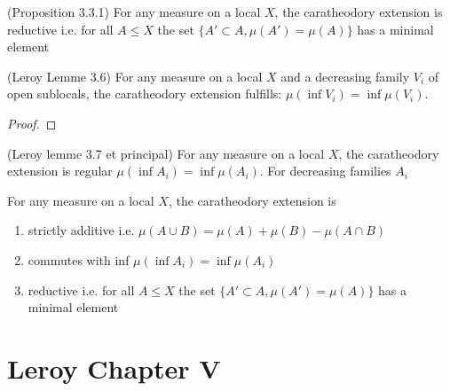 \begin{proposition}[reductive]
    \label{prop:reductive}  (Proposition 3.3.1)
    For any measure on a local $X$, the caratheodory extension is
    reductive i.e. for all $A \le X$ the set $\{A' \subset A, \mu(A') = \mu(A)\}$ has a minimal element
\end{proposition}



\begin{lemma}
(Leroy Lemme 3.6)
    \label{lem:commutes_with_inf_opens}
    \leanok
    For any measure on a local $X$ and a decreasing family $V_i$ of open sublocals, the caratheodory extension fulfills: $\mu (\inf V_i) = \inf \mu(V_i)$.
\end{lemma}
\begin{proof}
    \leanok
\end{proof}

\begin{proposition}
(Leroy lemme 3.7 et principal)
    \label{prop:commutes_with_inf}
    For any measure on a local $X$, the caratheodory extension is
    regular $\mu (\inf A_i) = \inf \mu(A_i)$. For decreasing families $A_i$
\end{proposition}

\begin{theorem}
    \label{thm:main}
    For any measure on a local $X$, the caratheodory extension is
    \begin{enumerate}
        \item strictly additive i.e. $\mu (A \cup B) = \mu(A) + \mu(B) - \mu(A \cap B)$
        \item commutes with inf $\mu (\inf A_i) = \inf \mu(A_i)$
        \item reductive i.e. for all $A \le X$ the set $\{A' \subset A, \mu(A') = \mu(A)\}$ has a minimal element
    \end{enumerate}
\end{theorem}


\chapter{Leroy Chapter V}\label{sec:leroy-chapter-v}


